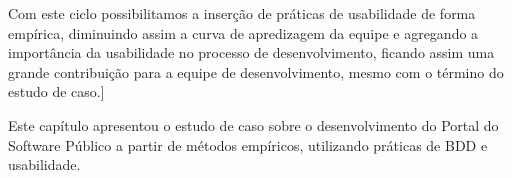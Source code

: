 Com este ciclo possibilitamos a inserção de práticas de usabilidade de forma empírica, diminuindo assim a curva de apredizagem da equipe e agregando a importância da usabilidade no processo de desenvolvimento, ficando assim uma grande contribuição para a equipe de desenvolvimento, mesmo com o término do estudo de caso.]

Este capítulo apresentou o estudo de caso sobre o desenvolvimento do Portal do Software Público a partir de métodos empíricos, utilizando práticas de BDD e usabilidade.

